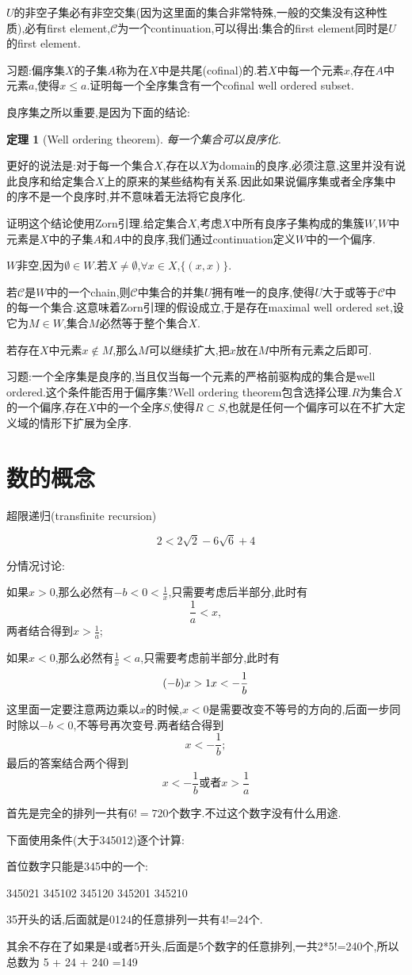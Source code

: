 \documentclass[12pt,a4paper,openany]{book}
\newtheorem{theorem}{定理}[section]
\begin{document}
$U$的非空子集必有非空交集(因为这里面的集合非常特殊,一般的交集没有这种性质),必有first element,$\mathscr{C}$为一个continuation,可以得出:集合的first element同时是$U$的first element.

习题:偏序集$X$的子集$A$称为在$X$中是共尾(cofinal)的.若$X$中每一个元素$x$,存在$A$中元素$a$,使得$x \le a$.证明每一个全序集含有一个cofinal well ordered subset.

良序集之所以重要,是因为下面的结论:

\begin{theorem}[Well ordering theorem]
每一个集合可以良序化.
\end{theorem}

更好的说法是:对于每一个集合$X$,存在以$X$为domain的良序,必须注意,这里并没有说此良序和给定集合$X$上的原来的某些结构有关系.因此如果说偏序集或者全序集中的序不是一个良序时,并不意味着无法将它良序化.

证明这个结论使用Zorn引理.给定集合$X$,考虑$X$中所有良序子集构成的集簇$W$,$W$中元素是$X$中的子集$A$和$A$中的良序,我们通过continuation定义$W$中的一个偏序.

$W$非空,因为$\emptyset \in W$.若$X \neq \emptyset$,$\forall x \in X$,$\{(x,x)\}$.

若$\mathscr{C}$是$W$中的一个chain,则$\mathscr{C}$中集合的并集$U$拥有唯一的良序,使得$U$大于或等于$\mathscr{C}$中的每一个集合.这意味着Zorn引理的假设成立,于是存在maximal well ordered set,设它为$M \in W$,集合$M$必然等于整个集合$X$.

若存在$X$中元素$x \notin M$,那么$M$可以继续扩大,把$x$放在$M$中所有元素之后即可.

习题:一个全序集是良序的,当且仅当每一个元素的严格前驱构成的集合是well ordered.这个条件能否用于偏序集?Well ordering theorem包含选择公理.$R$为集合$X$的一个偏序,存在$X$中的一个全序$S$,使得$R \subset S$,也就是任何一个偏序可以在不扩大定义域的情形下扩展为全序.



\chapter{数的概念}
超限递归(transfinite recursion)

\[
2 < 2\sqrt{2} - 6\sqrt{6}+4
\]


分情况讨论:

如果$x > 0$,那么必然有$-b < 0 < \frac{1}{x}$,只需要考虑后半部分,此时有
\[
\frac{1}{a} < x,
\]
两者结合得到$x > \frac{1}{a}$;

如果$x < 0$,那么必然有$\frac{1}{x} < a$,只需要考虑前半部分,此时有
\[
(-b)x > 1 \\
x < -\frac{1}{b}
\]
这里面一定要注意两边乘以$x$的时候,$x<0$是需要改变不等号的方向的,后面一步同时除以$-b < 0$,不等号再次变号.两者结合得到
\[
x < -\frac{1}{b};
\]
最后的答案结合两个得到
\[
x < -\frac{1}{b} \text{或者} x > \frac{1}{a}
\]

首先是完全的排列一共有$6!=720$个数字.不过这个数字没有什么用途.

下面使用条件(大于345012)逐个计算:

首位数字只能是345中的一个:

345021
345102
345120
345201
345210

35开头的话,后面就是0124的任意排列一共有4!=24个.

其余不存在了如果是4或者5开头,后面是5个数字的任意排列,一共2*5!=240个,所以总数为
5 + 24 + 240 =149
\end{document}
